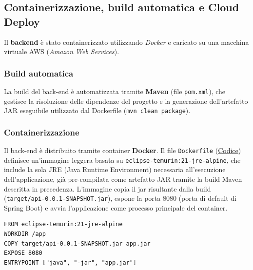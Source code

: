 \documentclass[a4paper,12pt]{article}
\begin{document}
\subsection{Containerizzazione, build automatica e Cloud Deploy} Il \textbf{backend} è stato containerizzato utilizzando \textit{Docker} e caricato su una macchina virtuale AWS (\textit{Amazon Web Services}).  


\subsubsection{Build automatica}

La build del back-end è automatizzata tramite \textbf{Maven} (file \texttt{pom.xml}), che gestisce la risoluzione delle dipendenze del progetto e la generazione dell'artefatto JAR eseguibile utilizzato dal Dockerfile (\texttt{mvn clean package}). 

\subsubsection{Containerizzazione}

Il back-end è distribuito tramite container \textbf{Docker}. Il file \texttt{Dockerfile} (\hyperref[lst:dockerfile]{Codice}) definisce un'immagine leggera basata su \texttt{eclipse-temurin:21-jre-alpine}, che include la sola JRE (Java Runtime Environment) necessaria all'esecuzione dell'applicazione, già pre-compilata come artefatto JAR tramite la build Maven descritta in precedenza. L'immagine copia il jar risultante dalla build (\texttt{target/api-0.0.1-SNAPSHOT.jar}), espone la porta 8080 (porta di default di Spring Boot) e avvia l'applicazione come processo principale del container. 

\begin{lstlisting}[caption={Docker File}, label={lst:dockerfile}]
FROM eclipse-temurin:21-jre-alpine
WORKDIR /app
COPY target/api-0.0.1-SNAPSHOT.jar app.jar
EXPOSE 8080
ENTRYPOINT ["java", "-jar", "app.jar"]
\end{lstlisting}
\end{document}

